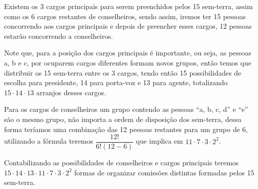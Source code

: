 Existem os 3 cargos principais para serem preenchidos pelos 15 sem-terra, assim como os 6 cargos restantes de conselheiros, sendo assim, iremos ter 15 pessoas concorrendo aos cargos principais e depois de preencher esses cargos, 12 pessoas estarão concorrendo a conselheiros.

Note que, para a posição dos cargos principais é importante, ou seja, as pessoas a, b e c, por ocuparem cargos diferentes formam novos grupos, então temos que distribuir os 15 sem-terra entre os 3 cargos, tendo então 15 possibilidades de escolha para presidente, 14 para porta-voz e 13 para agente, totalizando $15 \cdot 14 \cdot 13$ arranjos desses cargos.

Para os cargos de conselheiros um grupo contendo as pessoas ``a, b, c, d'' e ``e'' são o mesmo grupo, não importa a ordem de disposição dos sem-terra, dessa forma teríamos uma combinação das 12 pessoas restantes para um grupo de 6, utilizando a fórmula teremos $\dfrac{12!}{6!(12-6)}$ que implica em $11 \cdot 7 \cdot 3 \cdot 2^{2}$.

Contabilizando as possibilidades de conselheiros e cargos principais teremos  $15 \cdot 14 \cdot 13 \cdot 11 \cdot 7 \cdot 3 \cdot 2^{2}$ formas de organizar comissões distintas formadas pelos 15 sem-terra.
